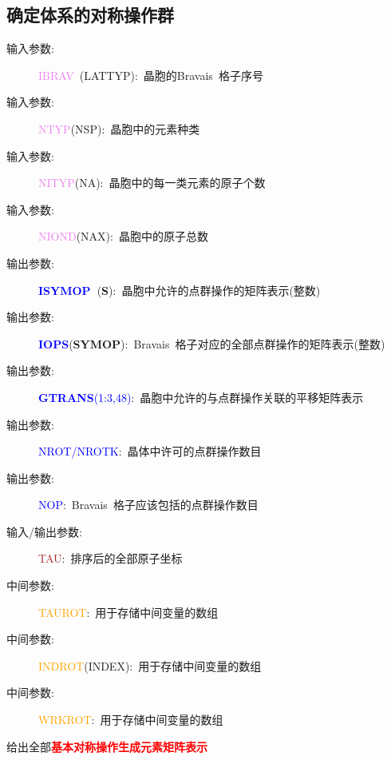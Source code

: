 \documentclass{article}      %
\begin{document}
\subsection{确定体系的对称操作群}
\begin{description}
	\item[输入参数:~]\textcolor{violet}{\textrm{IBRAV~}}(\textrm{LATTYP}):~晶胞的\textrm{Bravais~}格子序号
	\item[输入参数:~]\textcolor{violet}{\textrm{NTYP}}(\textrm{NSP}):~晶胞中的元素种类
	\item[输入参数:~]\textcolor{violet}{\textrm{NITYP}}(\textrm{NA}):~晶胞中的每一类元素的原子个数
	\item[输入参数:~]\textcolor{violet}{\textrm{NIOND}}(\textrm{NAX}):~晶胞中的原子总数
	\item[输出参数:~]\textcolor{blue}{\textbf{ISYMOP~}}(\textbf{S}):~晶胞中允许的点群操作的矩阵表示(整数)
	\item[输出参数:~]\textcolor{blue}{\textbf{IOPS}}(\textbf{SYMOP}):~\textrm{Bravais~}格子对应的全部点群操作的矩阵表示(整数)
	\item[输出参数:~]\textcolor{blue}{\textbf{GTRANS}(1:3,48)}:~晶胞中允许的与点群操作关联的平移矩阵表示
	\item[输出参数:~]\textcolor{blue}{\textrm{NROT/NROTK}}:~晶体中许可的点群操作数目
	\item[输出参数:~]\textcolor{blue}{\textrm{NOP}}:~\textrm{Bravais~}格子应该包括的点群操作数目
	\item[输入/输出参数:~]\textcolor{brown}{\textrm{TAU}}:~排序后的全部原子坐标
	\item[中间参数:~]\textcolor{orange}{\textrm{TAUROT}}:~用于存储中间变量的数组
	\item[中间参数:~]\textcolor{orange}{\textrm{INDROT}}(\textrm{INDEX}):~用于存储中间变量的数组
	\item[中间参数:~]\textcolor{orange}{\textrm{WRKROT}}:~用于存储中间变量的数组
\end{description}
给出全部\textcolor{red}{\textbf{基本对称操作生成元素矩阵表示}}
\end{document}
